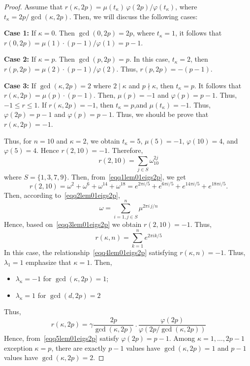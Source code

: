 \documentclass[12pt]{amsart}
\begin{document}
\begin{proof}
Assume that $r(\kappa, 2p) = \mu(t_{\kappa})\,\varphi(2p)/\varphi(t_{\kappa})$, where $t_{\kappa} = 2p/\gcd(\kappa, 2p)$. Then, we will discuss the following cases: 

  \textbf{Case 1:} If $\kappa = 0$. Then $\gcd(0, 2p) = 2p$, where  $t_{\kappa} = 1$, it follows that 
  $r(0, 2p) = \mu(1)\cdot(p-1)/\varphi(1) = p-1$.

\medskip

  \textbf{Case 2:} If  $\kappa = p$. Then $\gcd(p, 2p) = p$. In this case,  $t_{\kappa} = 2$, then
  $r(p, 2p) = \mu(2)\cdot(p-1)/\varphi(2).$ Thus, $r(p, 2p)=-(p-1)$.

\medskip

  \textbf{Case 3:} If  $\gcd(\kappa, 2p) = 2$ where $2 \mid \kappa$ and  $p \nmid \kappa$, then $t_{\kappa} = p$. It follows that
  $r(\kappa, 2p) = \mu(p)\cdot(p-1).$ Then, 
  $\mu(p)=-1$ and $\varphi(p)=p-1$. Thus, $-1\leqslant r\leqslant 1$. If $r(\kappa,2p)=-1$, then $t_{\kappa}=p$,and $\mu(t_{\kappa})=-1$. Thus, 
  $\varphi(2p)=p-1$ and  $\varphi(p)=p-1$. Thus, we should be prove that $r(\kappa,2p)=-1.$

Thus, for $n=10$ and $\kappa=2$, we obtain  $t_{\kappa}=5$, $\mu(5)=-1$,
  $\varphi(10)=4$, and  $\varphi(5)=4$. Hence $r(2,10)=-1$. 
  Therefore, 
  \begin{equation}~\label{eqq1lem01eigs2p}
  r(2,10)=\sum_{j\in S}\omega_{10}^{2j}  
  \end{equation}
 where
  $S=\{1,3,7,9\}$. Then, from~\eqref{eqq1lem01eigs2p}, we get
  \begin{equation}~\label{eqq2lem01eigs2p}
r(2,10)=\omega^2+\omega^6+\omega^{14}+\omega^{18}=e^{2\pi i/5}+e^{6\pi i/5}+e^{14\pi i /5}+e^{18\pi i/5}.
  \end{equation}
  Then, according to~\eqref{eqq2lem01eigs2p}, 
  \begin{equation}~\label{eqq3lem01eigs2p}
\omega=\sum_{i=1, j\in S}^{n}\mu^{2\pi i\,j/n} 
  \end{equation}
Hence, based on~\eqref{eqq3lem01eigs2p} we obtain $r(2,10)=-1$. Thus, 
 \begin{equation}~\label{eqq4lem01eigs2p}
r(\kappa,n)=\sum_{k=1}^{n}e^{2\pi ik/5}  
  \end{equation}
In this case, the relationship~\eqref{eqq4lem01eigs2p} satisfying $r(\kappa,n)=-1$.  
Thus, $\lambda_1=1$ emphasize that $\kappa=1$. Then, 
\begin{itemize}
\item $\lambda_{\kappa}=-1$ for $\gcd(\kappa,2p)=1$; 
\item  $\lambda_{\kappa}=1$ for $\gcd(d,2p)=2$
\end{itemize}
  Thus,
  \begin{equation}~\label{eqq5lem01eigs2p}
r(\kappa, 2p)=\gamma\frac{2p}{\gcd(\kappa,2p)}\,.\,\frac{\varphi(2p)}{\varphi(2p/\gcd(\kappa,2p))}
  \end{equation}
Hence, from~\eqref{eqq5lem01eigs2p} satisfy $\varphi(2p)=p-1$. Among $\kappa= 1, \ldots, 2p-1$ exception $\kappa= p$, there are   exactly $p-1$ values have $\gcd(\kappa, 2p) = 1$ and
  $p-1$ values have $\gcd(\kappa, 2p) = 2$. 
\end{proof}
\end{document}
